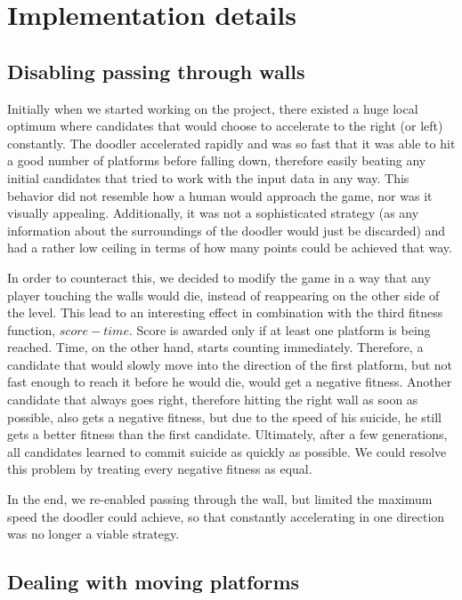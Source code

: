 \documentclass[a4paper,12pt,pagesize,headsepline,bibtotoc,titlepage,abstracton]{scrartcl}
\begin{document}
\section{Implementation details}
\label{sec:id}
\subsection{Disabling passing through walls}

Initially when we started working on the project, there existed a huge local optimum where candidates that would choose to accelerate to the right (or left) constantly. The doodler accelerated rapidly and was so fast that it was able to hit a good number of platforms before falling down, therefore easily beating any initial candidates that tried to work with the input data in any way. This behavior did not resemble how a human would approach the game, nor was it visually appealing. Additionally, it was not a sophisticated strategy (as any information about the surroundings of the doodler would just be discarded) and had a rather low ceiling in terms of how many points could be achieved that way.

In order to counteract this, we decided to modify the game in a way that any player touching the walls would die, instead of reappearing on the other side of the level. This lead to an interesting effect in combination with the third fitness function, $score - time$. Score is awarded only if at least one platform is being reached. Time, on the other hand, starts counting immediately. Therefore, a candidate that would slowly move into the direction of the first platform, but not fast enough to reach it before he would die, would get a negative fitness. Another candidate that always goes right, therefore hitting the right wall as soon as possible, also gets a negative fitness, but due to the speed of his suicide, he still gets a better fitness than the first candidate. Ultimately, after a few generations, all candidates learned to commit suicide as quickly as possible. We could resolve this problem by treating every negative fitness as equal.

In the end, we re-enabled passing through the wall, but limited the maximum speed the doodler could achieve, so that constantly accelerating in one direction was no longer a viable strategy.

\subsection{Dealing with moving platforms}
\end{document}
